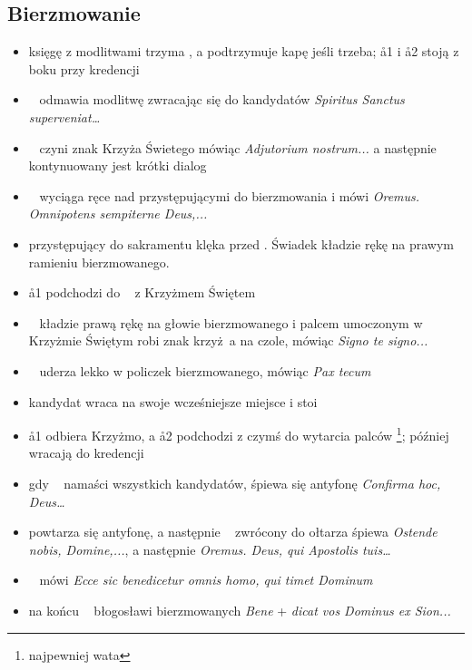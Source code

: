 \subsection{Bierzmowanie}
\label{sec:bierz}
\begin{itemize}
      \item księgę z modlitwami trzyma , a  podtrzymuje kapę jeśli
            trzeba; \aa1 i \aa2 stoją z boku przy kredencji
      \item \ii~ odmawia modlitwę zwracając się do kandydatów \textit{Spiritus
                  Sanctus superveniat\dots}
      \item \ii~ czyni znak Krzyża Świetego mówiąc \textit{Adjutorium
                  nostrum...} a następnie kontynuowany jest krótki dialog
      \item \ii~ wyciąga ręce nad przystępującymi do bierzmowania i mówi
            \textit{Oremus. Omnipotens sempiterne Deus,...}
      \item przystępujący do sakramentu klęka przed \ii. Świadek kładzie rękę na
            prawym ramieniu bierzmowanego.
      \item \aa1 podchodzi do \ii~ z Krzyżmem Świętem
      \item \ii~ kładzie prawą rękę na głowie bierzmowanego i palcem umoczonym w
            Krzyżmie Świętym robi znak krzyż a na czole, mówiąc \textit{Signo te
                  signo...}
      \item \ii~ uderza lekko w policzek bierzmowanego, mówiąc \textit{Pax tecum}
      \item kandydat wraca na swoje wcześniejsze miejsce i stoi
      \item \aa1 odbiera Krzyżmo, a \aa2 podchodzi z czymś do wytarcia palców
            \footnote{najpewniej wata}; później wracają do kredencji
      \item gdy \ii~ namaści wszystkich kandydatów, śpiewa się antyfonę
            \textit{Confirma hoc, Deus\dots}
      \item powtarza się antyfonę, a następnie \ii~ zwrócony do ołtarza śpiewa
            \textit{Ostende nobis, Domine,...}, a następnie \textit{Oremus.
                  Deus, qui Apostolis tuis\dots}
      \item \ii~ mówi \textit{Ecce sic benedicetur omnis homo, qui timet Dominum}
      \item na końcu \ii~ błogosławi bierzmowanych
            \textit{Bene} + \textit{dicat vos Dominus ex Sion...}
\end{itemize}

